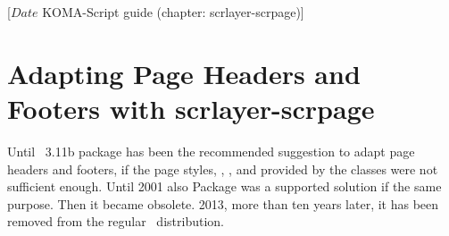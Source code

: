 %
%
%
%
%
%
%
%
% 
%
%
%
%

%
                 [$Date$
                  KOMA-Script guide (chapter: scrlayer-scrpage)]


\chapter[{Adapting Page Headers and Footers with scrlayer-scrpage}]
  {Adapting Page Headers and
  Footers with scrlayer-scrpage}
%
%

Until \KOMAScript~3.11b package  has been the recommended
suggestion to adapt page headers and footers, if the page
styles, , , and
 provided by the \KOMAScript{} classes were not sufficient
enough. Until 2001 also Package  was a supported solution if
the same purpose. Then it became obsolete. 2013, more than ten years later, it
has been removed from the regular \KOMAScript~distribution.

